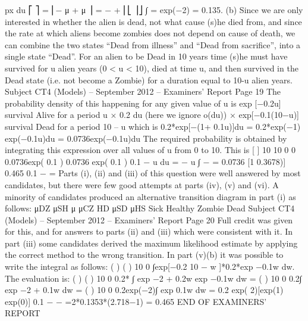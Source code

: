 px du
⎡ ⎤
= ⎢− μ + μ ⎥ = − +
⎢⎣ ⎥⎦
∫
= exp(−2) = 0.135.
(b) Since we are only interested in whether the alien is dead, not what cause (s)he
died from,
and since the rate at which aliens become zombies does not depend on cause
of death, we can combine the two states “Dead from illness” and “Dead from
sacrifice”, into a single state “Dead”.
For an alien to be Dead in 10 years time (s)he must have survived for u
alien years (0 < u < 10), died at time u, and then survived in the Dead state (i.e.
not become a Zombie) for a duration equal to 10-u alien years.
Subject CT4 (Models) – September 2012 – Examiners’ Report
Page 19
The probability density of this happening for any given value of u is
exp [−0.2u] survival Alive for a period u
×
0.2 du (here we ignore o(du))
×
exp[−0.1(10−u)] survival Dead for a period 10 – u
which is
0.2*exp[−(1+ 0.1u)]du = 0.2*exp(−1) exp(−0.1u)du
= 0.0736exp(−0.1u)du
The required probability is obtained by integrating this expression over
all values of u from 0 to 10.
This is
[ ]
10
10
0
0
0.0736exp( 0.1 ) 0.0736 exp( 0.1 )
0.1
− u du = − u
∫ −
= 0.0736 [1 0.3678)] 0.465
0.1
− =
Parts (i), (ii) and (iii) of this question were well answered by most candidates, but there were
few good attempts at parts (iv), (v) and (vi). A minority of candidates produced an
alternative transition diagram in part (i) as follows:
μDZ
μSH
μ μCZ HD μSD
μHS
Sick
Healthy
Zombie
Dead
Subject CT4 (Models) – September 2012 – Examiners’ Report
Page 20
Full credit was given for this, and for answers to parts (ii) and (iii) which were consistent
with it. In part (iii) some candidates derived the maximum likelihood estimate by applying
the correct method to the wrong transition. In part (v)(b) it was possible to write the integral
as follows:
( ) ( )
10
0
∫exp[−0.2 10 − w ]*0.2*exp −0.1w dw.
The evaluation is:
( ) ( )
10
0
0.2* ∫ exp −2 + 0.2w exp −0.1w dw
= ( )
10
0
0.2∫ exp −2 + 0.1w dw
= ( )
10
0
0.2exp(−2)∫ exp 0.1w dw
= 0.2 exp( 2)[exp(1) exp(0)]
0.1
− −
=2*0.1353*(2.718−1) = 0.465
END OF EXAMINERS’ REPORT
